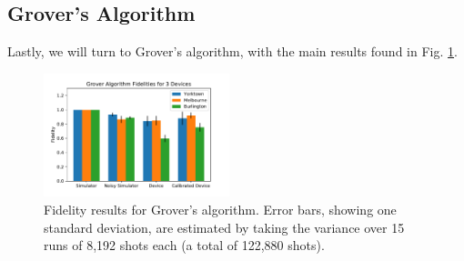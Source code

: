\subsection{Grover's Algorithm}
Lastly, we will turn to Grover's algorithm, with the main results found in Fig.
\ref{fig:grover_histogram}.

\begin{figure}[h!]
	\centering
	\includegraphics[width=0.48\textwidth]{images/results/grover_histogram.pdf}
	\caption{Fidelity results for Grover's algorithm. Error bars, showing
		one standard deviation, are estimated by taking the variance over 15 runs of
		8,192 shots each (a total of 122,880 shots).}
	\label{fig:grover_histogram}
\end{figure}

